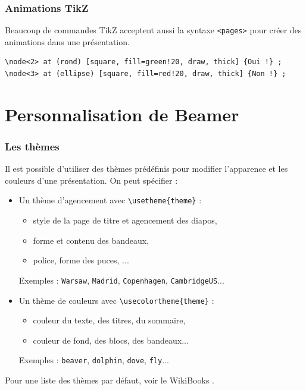 \begin{frame}[fragile, t]
  \frametitle{Animations TikZ}

\begin{figure}
\end{figure}

\bigskip
Beaucoup de commandes TikZ acceptent aussi la syntaxe \lstinline?<pages>? pour créer des animations dans une présentation.

\bigskip
\begin{lstlisting}
\node<2> at (rond) [square, fill=green!20, draw, thick] {Oui !} ;
\node<3> at (ellipse) [square, fill=red!20, draw, thick] {Non !} ;
\end{lstlisting}
\end{frame}



\section{Personnalisation de Beamer}

\begin{frame}[fragile]
  \frametitle{Les thèmes}

Il est possible d'utiliser des thèmes prédéfinis pour modifier l'apparence et les couleurs d'une présentation. On peut spécifier :
\begin{itemize}
  \item Un thème d'agencement avec \lstinline?\usetheme{theme}? :
  \begin{itemize}
    \item style de la page de titre et agencement des diapos,
    \item forme et contenu des bandeaux,
    \item police, forme des puces, ...
  \end{itemize}
  Exemples : \lstinline?Warsaw?, \lstinline?Madrid?, \lstinline?Copenhagen?, \lstinline?CambridgeUS?...
  \item Un thème de couleurs avec \lstinline?\usecolortheme{theme}? :
  \begin{itemize}
    \item couleur du texte, des titres, du sommaire,
    \item couleur de fond, des blocs, des bandeaux...
  \end{itemize}
  Exemples : \lstinline?beaver?, \lstinline?dolphin?, \lstinline?dove?, \lstinline?fly?...
\end{itemize}

\bigskip
Pour une liste des thèmes par défaut, voir le WikiBooks \cite{wikibooksbeamer}.
\end{frame}



